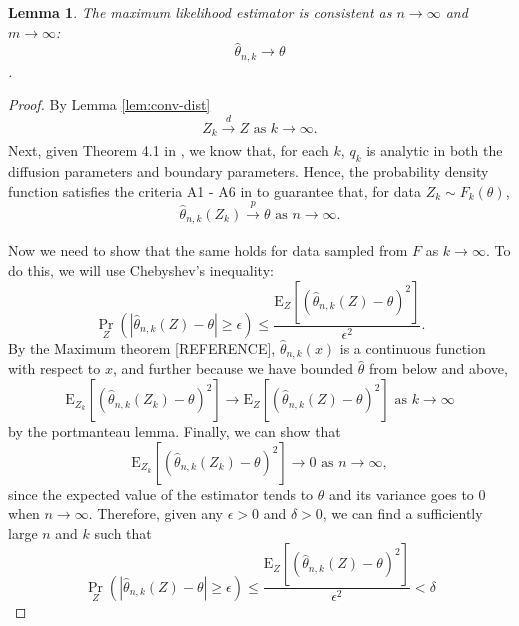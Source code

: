 \documentclass[10pt]{article}
\newtheorem{lemma}{Lemma}
\begin{document}
\begin{lemma}
  The maximum likelihood estimator is consistent as $n \to \infty$ and $m \to \infty$:
  \[ \hat{\theta}_{n,k} \to \theta \].
\end{lemma}
\begin{proof}
  By Lemma \ref{lem:conv-dist}
    \[ Z_k \xrightarrow[]{d} Z \mbox { as } k \to \infty. \] Next,
    given Theorem 4.1 in \cite{singler2008differentiability}, we know
    that, for each $k$, $q_k$ is analytic in both the diffusion
    parameters and boundary parameters. Hence, the probability density
    function satisfies the criteria A1 - A6 in
    \cite{casella2002statistical} to guarantee that, for data
    $Z_{k} \sim F_k(\theta)$,
    \[ \hat{\theta}_{n,k}(Z_k) \xrightarrow[]{p} \theta \mbox{ as } n
      \to \infty. \]

    Now we need to show that the same holds for data sampled from $F$
    as $k \to \infty$. To do this, we will use Chebyshev's inequality:
  \[
    \Pr_{Z}\left( \left| \hat{\theta}_{n,k}(Z) - \theta \right| \geq
      \epsilon \right) \leq \frac{ \mbox{E}_{Z}\left[
        (\hat{\theta}_{n,k}(Z) - \theta)^2 \right] }{ \epsilon^2 }.
  \]
  By the Maximum theorem [REFERENCE], $\hat{\theta}_{n,k}(x)$ is a continuous
  function with respect to $x$, and further because we have bounded
  $\hat{\theta}$ from below and above,
  \[
    \mbox{E}_{Z_k}\left[ (\hat{\theta}_{n,k}(Z_k) - \theta)^2 \right]
    \to \mbox{E}_{Z}\left[ (\hat{\theta}_{n,k}(Z) - \theta)^2 \right]
    \mbox{ as } k \to \infty
  \]
  by the portmanteau lemma. Finally, we can show that
  \begin{equation}
    \mbox{E}_{Z_k}\left[ (\hat{\theta}_{n,k}(Z_k) - \theta)^2 \right]
    \to 0 \mbox{ as } n \to \infty, \label{eq:var-lim}
  \end{equation}
  since the expected value of the estimator tends to $\theta$ and its
  variance goes to 0 when $n \to \infty$. Therefore, given any
  $\epsilon > 0$ and $\delta > 0$, we can find a sufficiently large
  $n$ and $k$ such that
  \[
    \Pr_{Z}\left( \left| \hat{\theta}_{n,k}(Z) - \theta \right| \geq
      \epsilon \right) \leq \frac{ \mbox{E}_{Z}\left[
        (\hat{\theta}_{n,k}(Z) - \theta)^2 \right] }{ \epsilon^2 } < \delta    
  \]
\end{proof}




\end{document}
